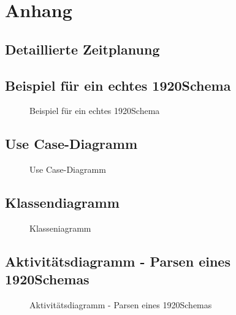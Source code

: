 \section{Anhang}
\subsection{Detaillierte Zeitplanung}
\label{app:Zeitplanung}


\clearpage
\subsection{Beispiel für ein echtes 1920Schema}
\label{app:RealSchema}
\begin{figure}[htb]
\centering
{}
\caption{Beispiel für ein echtes 1920Schema}
\end{figure}
\clearpage

\subsection{Use Case-Diagramm}
\label{app:UseCase}
\begin{figure}[htb]
\centering
{}
\caption{Use Case-Diagramm}
\end{figure}
\clearpage


\clearpage

\subsection{Klassendiagramm}
\label{app:classd}
\begin{figure}[htb]
\centering
{}
\caption{Klasseniagramm}
\end{figure}
\clearpage

\subsection{Aktivitätsdiagramm - Parsen eines 1920Schemas}
\label{app:AktivitaetsdiagrammSchemaParsen}
\begin{figure}[htb]
\centering
{}
\caption{Aktivitätsdiagramm - Parsen eines 1920Schemas}
\end{figure}
\clearpage


